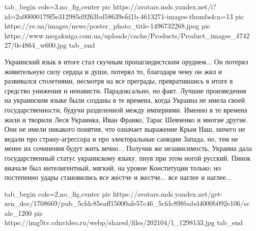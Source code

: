 \ifcmt
  tab_begin cols=3,no_fig,center
     pic https://avatars.mds.yandex.net/i?id=2a00000179f5e312985d9263bd58639efd1b-4613271-images-thumbs&n=13
		 pic https://ye.ua/images/news/poster_photo_title-1496732268.jpeg
		 pic https://www.megakniga.com.ua/uploads/cache/Products/Product_images_474227/0c4864_w600.jpg
  tab_end
\fi

Украинский язык в итоге стал скучным пропагандистским орудием... Он потерял
живительную силу сердца и души, потерял то, благодаря чему он жил и развивался
столетиями, несмотря на все преграды, превратившись в итоге в средство унижения
и ненависти. Парадоксально, но факт. Лучшие произведения на украинском языке
были созданы в те времена, когда Украина не имела своей государственности,
будучи разделенной между империями. Именно в те времена жили и творили Леся
Украинка, Иван Франко, Тарас Шевченко и многие другие. Они не имели никакого
понятия, что означает выражение Крым Наш, ничего не ведали про страну-агрессора
и про электоральные санкции Запада, но, тем не менее их сочинения будут жить
вечно... Получив же независимость, Украина дала государственный статус
украинскому языку, пнув при этом ногой русский. Пинок вначале был
интелигентный, мягкий, на уровне Конституции только; но постепенно удары
становились все жестче и жестче... все наглее и наглее... 

\ifcmt
  tab_begin cols=2,no_fig,center
     pic https://avatars.mds.yandex.net/get-zen_doc/1708669/pub_5cfdc85eaff15000afe57c46_5cfdc898babd4000b092e106/scale_1200
		 pic https://img5tv.cdnvideo.ru/webp/shared/files/202104/1_1298133.jpg
  tab_end
\fi

